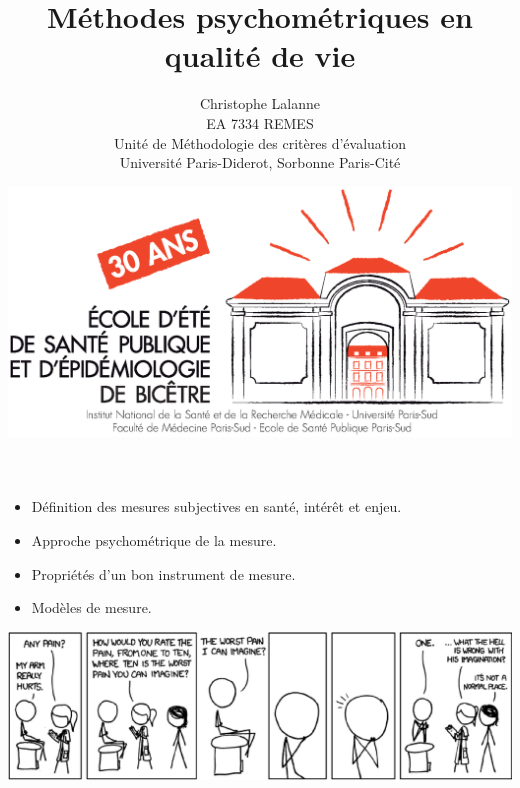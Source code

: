 

\title{Méthodes psychométriques en qualité de vie}
\author{Christophe Lalanne\\EA 7334 REMES\\ Unité de Méthodologie des critères d’évaluation\\Université Paris-Diderot, Sorbonne Paris-Cité\\}
\date{\includegraphics[height=18ex]{logo.eps}}




\LogoOff
\maketitle
\rightfooter{\quad\textsf{\thepage}}



\begin{itemize}
\item Définition des mesures subjectives en santé, intérêt et enjeu.
\item Approche psychométrique de la mesure.
\item Propriétés d'un bon instrument de mesure.
\item Modèles de mesure.
\end{itemize}

\foilhead{}

\bigskip
{\centering \includegraphics[width=\textwidth]{figs/pain.eps}\par}



